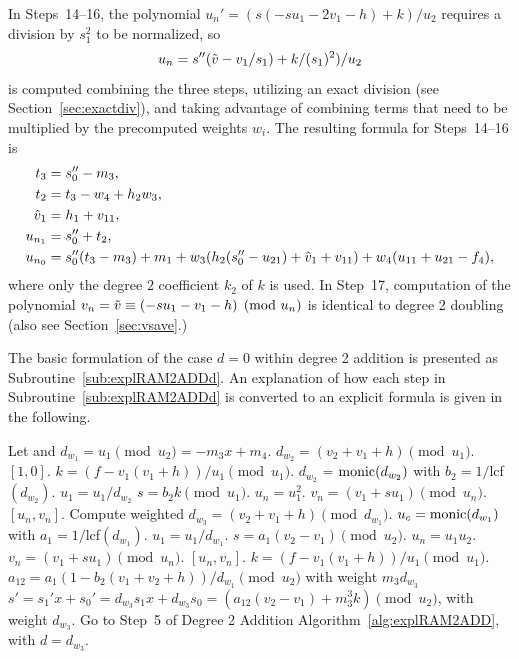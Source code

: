 In Steps~14--16, the polynomial $u_n' = (s(-su_1 - 2v_1 - h ) + k)/u_2$ requires a division by $s_1^2$ to
be normalized, so $$ u_n = s''(\tilde{v} - v_1/s_1) + k/(s_1)^2)/u_2$$ is computed combining the three steps,
utilizing an exact division (see Section~\ref{sec:exactdiv}), and taking advantage
of combining terms that need to be multiplied by the precomputed weights $w_i$.
The resulting formula for Steps~14--16 is 
\begin{align*}
    t_3 &= s''_0 - m_3,\\
    t_2 &= t_3- w_4 + h_2w_3,\\
    \hat{v}_1 &= h_1 + v_{11},\\
    u_{n_1} &= s_0'' + t_2,\\
    u_{n_0} &= s_0''(t_3 - m_3) + m_1 + w_3(h_2(s''_0 - u_{21}) + \hat{v}_1 + v_{11}) + w_4(u_{11} + u_{21} - f_4),
\end{align*}
where only the degree $2$ coefficient $k_2$ of $k$ is used. In Step~17,
computation of the polynomial $v_n = \tilde{v} \equiv (-su_1 - v_1 - h) \pmod{u_n}$ is
identical to degree 2 doubling (also see Section~\ref{sec:vsave}.)

The basic formulation of the case $d = 0$ within degree 2 addition is presented
as Subroutine~\ref{sub:explRAM2ADDd}. An explanation of how each step in
Subroutine~\ref{sub:explRAM2ADDd} is converted to an explicit formula is given
in the following. 

\begin{subroutine}[htbp]
    \caption{Genus 2 Ramified Model Degree 2 Addition ($d=0$)\label{sub:explRAM2ADDd}}
    \begin{algorithmic}[1]
    \State Let and $d_{w_1} = u_1 \pmod{u_2} = -m_3x + m_4$.
        \State $d_{w_2} = (v_2 + v_1 + h) \pmod{u_1}$.
         \Return $[1,0]$.
        \Else 
            \State $k = (f - v_1(v_1 + h))/u_1 \pmod{u_1}$.
            \State $d_{w_2}$ = $\operatorname{monic}(d_{w_2})$ with $b_2 = 1/$lcf$(d_{w_2})$.
            \State $u_1 = u_1/d_{w_2}$
            \State $s = b_2k \pmod{u_1}$.
            \State $u_n = u_1^2$.
            \State $v_n = (v_1 + su_1) \pmod{u_n}$.
            \State \Return $[u_n,v_n]$.
        \EndIf
    \Else 
        \State Compute weighted $d_{w_3} = (v_2 + v_1 + h) \pmod{d_{w_1}}$.
            \State $u_c = \operatorname{monic}(d_{w_1})$ with $a_1 = 1/$lcf$(d_{w_1})$.
            \State $u_1 = u_1/d_{w_1}$.
            \State $s = a_1(v_2 - v_1) \pmod{u_2}$.
            \State $u_n = u_1u_2$.
            \State $v_n = (v_1 + su_1) \pmod{u_n}$.
            \State \Return $[u_n,v_n]$.
        \Else 
            \State $k = (f - v_1(v_1 + h))/u_1 \pmod{u_1}$.
            \State $a_{12} = a_1(1 - b_2(v_1 + v_2 + h))/d_{w_1} \pmod{u_2}$ with weight $m_3d_{w_3}$
            \State $s' = s_1'x + s_0' = d_{w_3}s_1x + d_{w_3}s_0 = (a_{12}(v_2 - v_1) + m_3^3k) \pmod{u_2}$, with weight $d_{w_3}$.
            \State Go to Step~5 of Degree 2 Addition Algorithm~\ref{alg:explRAM2ADD}, with $d = d_{w_3}$.
        \EndIf
    \EndIf
    \end{algorithmic}
    \end{subroutine}


